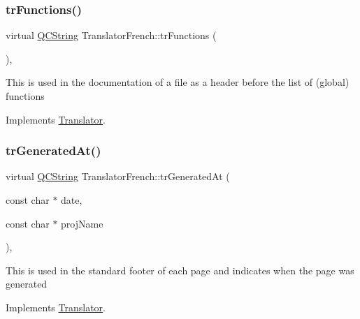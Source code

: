 \mbox{\label{class_translator_french_a9bc4c69b4d6ee71bc4ff53911eeceea1}} 
\subsubsection{\texorpdfstring{trFunctions()}{trFunctions()}}
{\footnotesize\ttfamily virtual \mbox{\hyperlink{class_q_c_string}{Q\+C\+String}} Translator\+French\+::tr\+Functions (\begin{DoxyParamCaption}{ }\end{DoxyParamCaption})\hspace{0.3cm}{\ttfamily [inline]}, {\ttfamily [virtual]}}

This is used in the documentation of a file as a header before the list of (global) functions 

Implements \mbox{\hyperlink{class_translator}{Translator}}.

\mbox{\label{class_translator_french_ad3fd04011eb0b3f529d3cd853b20e8b5}} 
\subsubsection{\texorpdfstring{trGeneratedAt()}{trGeneratedAt()}}
{\footnotesize\ttfamily virtual \mbox{\hyperlink{class_q_c_string}{Q\+C\+String}} Translator\+French\+::tr\+Generated\+At (\begin{DoxyParamCaption}\item[{const char $\ast$}]{date,  }\item[{const char $\ast$}]{proj\+Name }\end{DoxyParamCaption})\hspace{0.3cm}{\ttfamily [inline]}, {\ttfamily [virtual]}}

This is used in the standard footer of each page and indicates when the page was generated 

Implements \mbox{\hyperlink{class_translator}{Translator}}.

\mbox{\label{class_translator_french_aeb927a6c5d95de5c8ff270a2879000bf}} 

